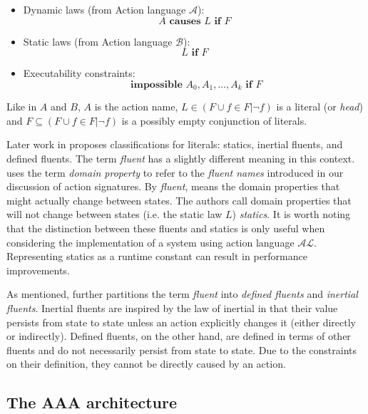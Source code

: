 \begin{itemize}
    \item Dynamic laws (from Action language $ \mathcal{A} $):
        $$
        A \textbf{ causes } L \textbf{ if } F
        $$

    \item Static laws (from Action language $ \mathcal{B} $):
        $$
        L \textbf{ if } F
        $$

    \item Executability constraints:
        $$
        \textbf{ impossible } A_0, A_1, \dots, A_k \textbf{ if } F
        $$
\end{itemize}

Like in $A$ and $B$, $A$ is the action name, $L \in(F \cup{f \in F| \neg f}) $ is a literal (or \textit{head}) and $F \subseteq(F \cup{f \in F| \neg f})$ is a possibly empty conjunction of literals.

Later work in \cite{gelfond_knowledge_2014} proposes classifications for literals: statics, inertial fluents, and defined fluents.
The term \textit{fluent} has a slightly different meaning in this context.
\cite{gelfond_knowledge_2014} uses the term \textit{domain property} to refer to the \textit{fluent names} introduced in our discussion of action signatures.
By \textit{fluent}, \cite{gelfond_knowledge_2014} means the domain properties that might actually change between states.
The authors call domain properties that will not change between states (i.e. the static law $L$) \textit{statics}.
It is worth noting that the distinction between these fluents and statics is only useful when considering the implementation of a system using action language $\mathcal{AL}$.
Representing statics as a runtime constant can result in performance improvements.

As mentioned, \cite{gelfond_knowledge_2014} further partitions the term \textit{fluent} into \textit{defined fluents} and \textit{inertial fluents}.
Inertial fluents are inspired by the law of inertial in that their value persists from state to state unless an action explicitly changes it (either directly or indirectly).
Defined fluents, on the other hand, are defined in terms of other fluents and do not necessarily persist from state to state.
Due to the constraints on their definition, they cannot be directly caused by an action.


\subsection{The AAA architecture}
\label{subsec:aaa_architecture}

